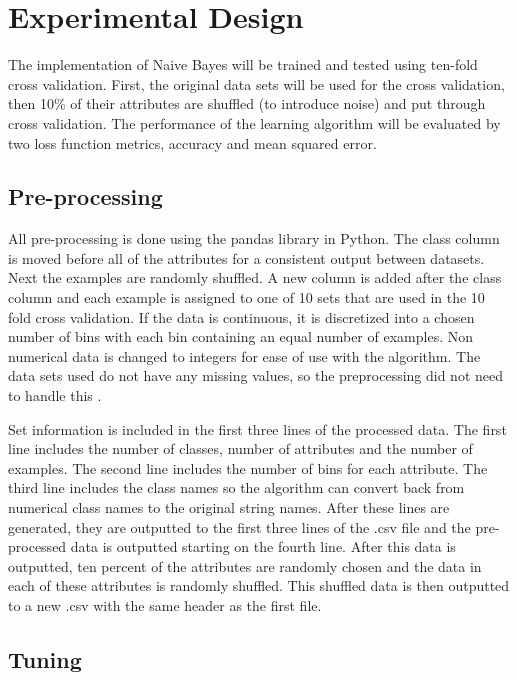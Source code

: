 \documentclass[twoside,11pt]{article}
\begin{document}
\section{Experimental Design}

The implementation of Naive Bayes will be trained and tested using ten-fold cross validation. First, the original data sets will be used for the cross validation, then 10\% of their attributes are shuffled (to introduce noise) and put through cross validation. The performance of the learning algorithm will be evaluated by two loss function metrics, accuracy and mean squared error. 


\subsection{Pre-processing}

All pre-processing is done using the pandas library in Python. The class column is moved before all of the attributes for a consistent output between datasets. Next the examples are randomly shuffled. A new column is added after the class column and each example is assigned to one of 10 sets that are used in the 10 fold cross validation. If the data is continuous, it is discretized into a chosen number of bins with each bin containing an equal number of examples. Non numerical data is changed to integers for ease of use with the algorithm. The data sets used do not have any missing values, so the preprocessing did not need to handle this \citep{datasets}.

Set information is included in the first three lines of the processed data. The first line includes the number of classes, number of attributes and the number of examples. The second line includes the number of bins for each attribute. The third line includes the class names so the algorithm can convert back from numerical class names to the original string names. After these lines are generated, they are outputted to the first three lines of the .csv file and the pre-processed data is outputted starting on the fourth line. After this data is outputted, ten percent of the attributes are randomly chosen and the data in each of these attributes is randomly shuffled. This shuffled data is then outputted to a new .csv with the same header as the first file.  

\subsection{Tuning}
\end{document}
